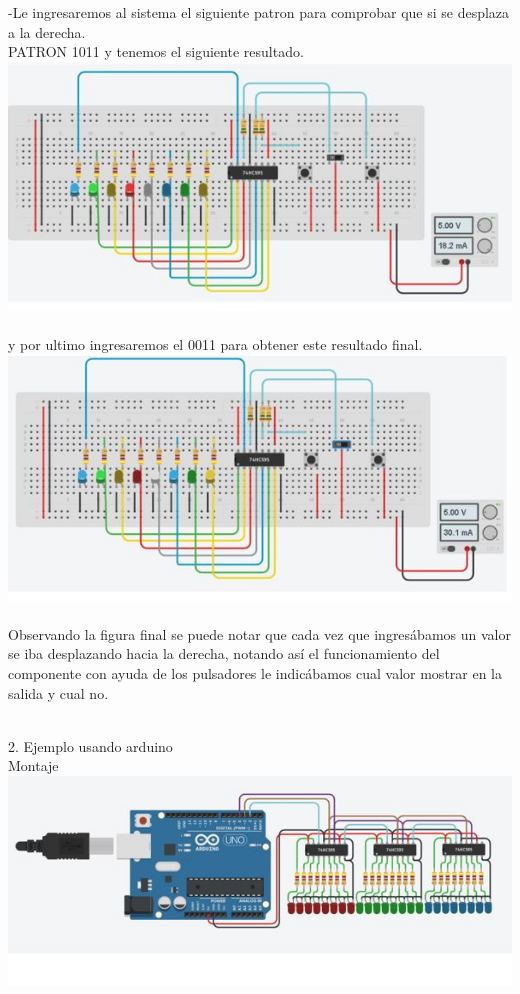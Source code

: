 \documentclass{article}
\begin{document}
-Le ingresaremos al sistema el siguiente patron para comprobar que si se desplaza a la derecha.\\
PATRON 1011 y tenemos el siguiente resultado.\\
\includegraphics[scale=0.7]{Captura2.JPG}\\
\\
y por ultimo ingresaremos el 0011 para obtener este resultado final.\\
\includegraphics[scale=0.7]{Captura3.JPG}\\
\\
Observando la figura final se puede notar que cada vez que ingresábamos un valor se iba desplazando hacia la derecha, notando así el funcionamiento del componente con ayuda de los pulsadores le indicábamos cual valor mostrar en la salida y cual no.\\
\\
\item 2. Ejemplo usando arduino\\
Montaje\\
\includegraphics[scale=0.7]{Captura4.JPG}\\
\end{document}
